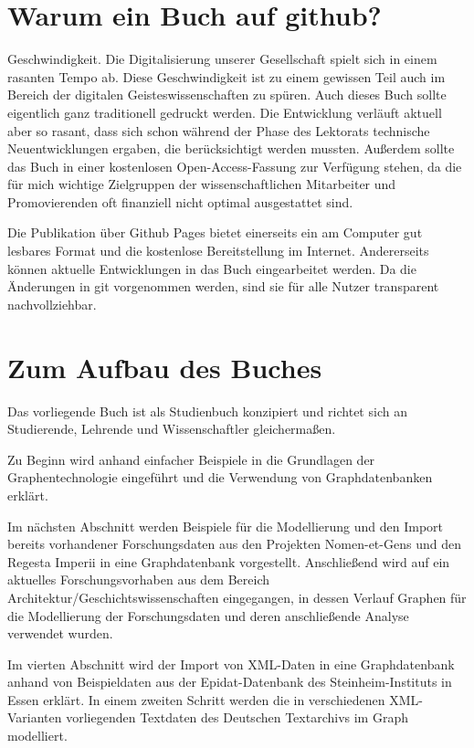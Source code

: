 \documentclass[ngerman,]{scrreprt}
\begin{document}
\hypertarget{warum-ein-buch-auf-github}{%
\section{Warum ein Buch auf github?}\label{warum-ein-buch-auf-github}}

Geschwindigkeit. Die Digitalisierung unserer Gesellschaft spielt sich in einem rasanten Tempo ab. Diese Geschwindigkeit ist zu einem gewissen Teil auch im Bereich der digitalen Geisteswissenschaften zu spüren. Auch dieses Buch sollte eigentlich ganz traditionell gedruckt werden. Die Entwicklung verläuft aktuell aber so rasant, dass sich schon während der Phase des Lektorats technische Neuentwicklungen ergaben, die berücksichtigt werden mussten. Außerdem sollte das Buch in einer kostenlosen Open-Access-Fassung zur Verfügung stehen, da die für mich wichtige Zielgruppen der wissenschaftlichen Mitarbeiter und Promovierenden oft finanziell nicht optimal ausgestattet sind.

Die Publikation über Github Pages bietet einerseits ein am Computer gut lesbares Format und die kostenlose Bereitstellung im Internet. Andererseits können aktuelle Entwicklungen in das Buch eingearbeitet werden. Da die Änderungen in git vorgenommen werden, sind sie für alle Nutzer transparent nachvollziehbar.

\hypertarget{zum-aufbau-des-buches}{%
\section{Zum Aufbau des Buches}\label{zum-aufbau-des-buches}}

Das vorliegende Buch ist als Studienbuch konzipiert und richtet sich an Studierende, Lehrende und Wissenschaftler gleichermaßen.

Zu Beginn wird anhand einfacher Beispiele in die Grundlagen der Graphentechnologie eingeführt und die Verwendung von Graphdatenbanken erklärt.

Im nächsten Abschnitt werden Beispiele für die Modellierung und den Import bereits vorhandener Forschungsdaten aus den Projekten Nomen-et-Gens und den Regesta Imperii in eine Graphdatenbank vorgestellt. Anschließend wird auf ein aktuelles Forschungsvorhaben aus dem Bereich Architektur/Geschichtswissenschaften eingegangen, in dessen Verlauf Graphen für die Modellierung der Forschungsdaten und deren anschließende Analyse verwendet wurden.

Im vierten Abschnitt wird der Import von XML-Daten in eine Graphdatenbank anhand von Beispieldaten aus der Epidat-Datenbank des Steinheim-Instituts in Essen erklärt. In einem zweiten Schritt werden die in verschiedenen XML-Varianten vorliegenden Textdaten des Deutschen Textarchivs im Graph modelliert.
\end{document}
